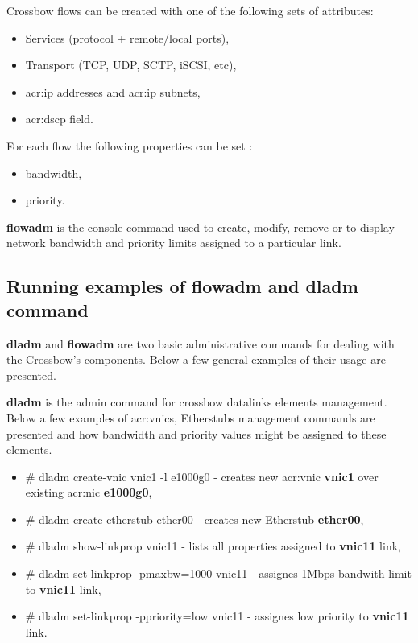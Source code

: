 \documentclass[11pt]{book}
\begin{document}
          \medskip

          Crossbow flows can be created with one of the following sets of attributes:

          \begin{itemize}
            \item Services (protocol + remote/local ports),
            \item Transport (TCP, UDP, SCTP, iSCSI, etc),
            \item \gls{acr:ip} addresses and \gls{acr:ip} subnets,
            \item \gls{acr:dscp} field.
          \end{itemize}

          For each flow the following properties can be set \cite{flows2}: 

          \begin{itemize}
            \item bandwidth,
            \item priority.
          \end{itemize}

          \medskip

          

          \textbf{flowadm} is the console command used to create, modify, remove or to display network bandwidth and
          priority limits assigned to a particular link. 


      \subsection{Running examples of flowadm and dladm command}

        \textbf{dladm} and \textbf{flowadm} are two basic administrative commands for dealing with the Crossbow's
        components. Below a few general examples of their usage are presented.
  
        \textbf{dladm} is the admin command for crossbow datalinks elements management. Below a few examples of \gls{acr:vnic}s,
        Etherstubs management commands are presented and how bandwidth and priority values might be assigned to these
        elements.
  
        \begin{itemize}
          \item \# dladm create-vnic vnic1 -l e1000g0 - creates new \gls{acr:vnic} \textbf{vnic1} over existing \gls{acr:nic} \textbf{e1000g0},
          \item \# dladm create-etherstub ether00 - creates new Etherstub \textbf{ether00},
          \item \# dladm show-linkprop vnic11 - lists all properties assigned to \textbf{vnic11} link,
          \item \# dladm set-linkprop -pmaxbw=1000 vnic11 - assignes 1Mbps bandwith limit to \textbf{vnic11} link,
          \item \# dladm set-linkprop -ppriority=low vnic11 - assignes low priority to \textbf{vnic11} link.
        \end{itemize}
  
\end{document}
